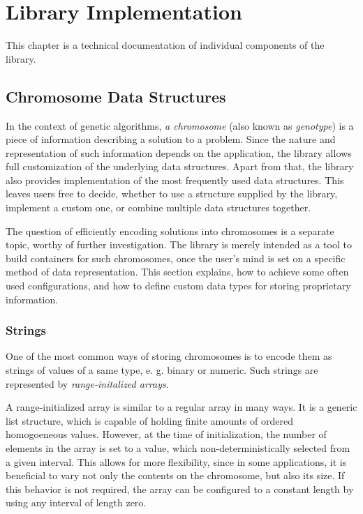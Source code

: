 \chapter{Library Implementation}
This chapter is a technical documentation of individual components of the library.

\section{Chromosome Data Structures}
In the context of genetic algorithms, \textit{a chromosome} (also known as \textit{genotype}) is a piece of information describing a solution to a problem. Since the nature and representation of such information depends on the application, the library allows full customization of the underlying data structures. Apart from that, the library also provides implementation of the most frequently used data structures. This leaves users free to decide, whether to use a structure supplied by the library, implement a custom one, or combine multiple data structures together.

The question of efficiently encoding solutions into chromosomes is a separate topic, worthy of further investigation. The library is merely intended as a tool to build containers for such chromosomes, once the user's mind is set on a specific method of data representation. This section explains, how to achieve some often used configurations, and how to define custom data types for storing proprietary information.

\subsection{Strings}
One of the most common ways of storing chromosomes is to encode them as strings of values of a same type, e. g. binary or numeric. Such strings are represented by \textit{range-initalized arrays}.

A range-initialized array is similar to a regular array in many ways. It is a generic list structure, which is capable of holding finite amounts of ordered homogoeneous values. However, at the time of initialization, the number of elements in the array is set to a value, which non-deterministically selected from a given interval. This allows for more flexibility, since in some applications, it is beneficial to vary not only the contents on the chromosome, but also its size. If this behavior is not required, the array can be configured to a constant length by using any interval of length zero.

